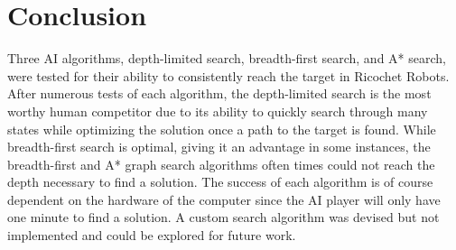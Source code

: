 \documentclass[a4paper,10pt]{article}
\begin{document}
\section{Conclusion}
Three AI algorithms, depth-limited search, breadth-first search, and A* search, were tested for their ability to consistently reach the target in Ricochet Robots. After numerous tests of each algorithm, the depth-limited search is the most worthy human competitor due to its ability to quickly search through many states while optimizing the solution once a path to the target is found.
While breadth-first search is optimal, giving it an advantage in some instances, the breadth-first and A* graph search algorithms often times could not reach the depth necessary to find a solution.
The success of each algorithm is of course dependent on the hardware of the computer since the AI player will only have one minute to find a solution. A custom search
algorithm was devised but not implemented and could be explored for future work.


\end{document}
